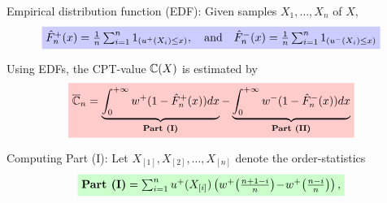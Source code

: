 \documentclass{beamer}
\begin{document}
\begin{frame}{}

\vspace{1ex}

\begin{small}
\alert{Empirical distribution function (EDF):} Given samples $X_1, \ldots, X_n$ of $X$, 
%
\begin{align*}
\tikz[baseline]{
            \node[fill=blue!20,anchor=base] (t1)
            {${\hat F_n}^+(x)=\frac{1}{n} \sum_{i=1}^n 1_{(u^+(X_i) \leq x)}, \quad\text{and}\quad {\hat F_n}^-(x)=\frac{1}{n} \sum_{i=1}^n 1_{(u^-(X_i) \leq x)}$};
        }
\end{align*}

\vspace{1ex}

Using EDFs, the CPT-value $\mathbb{C}(X)$ is estimated by
\begin{align*}
\tikz[baseline]{
            \node[fill=red!20,anchor=base] (t1)
            {
$\overline \C_n = \underbrace{\intinfinity w^+(1-{\hat F_n}^+(x))  dx}_{\textbf{Part (I)}} - \underbrace{\intinfinity w^-(1-{\hat F_n}^-(x))  dx}_{\textbf{Part (II)}}$
};
        }
        \end{align*}

\pause

\alert{Computing Part (I):} Let $X_{[1]}, X_{[2]}, \ldots ,X_{[n]}$ denote the order-statistics 				
        \begin{align*}
\tikz[baseline]{
            \node[fill=green!20,anchor=base] (t1)
            {
$\textbf{Part (I)} = \sum_{i=1}^{n} u^+(X_{[i]}) \left(w^+\!\left(\frac{n+1-i}{n}\right)\!-\! w^+\!\left(\frac{n-i}{n}\right) \right),$
};
        }
        \end{align*}
				
\end{small}
\end{frame}

\end{document}
